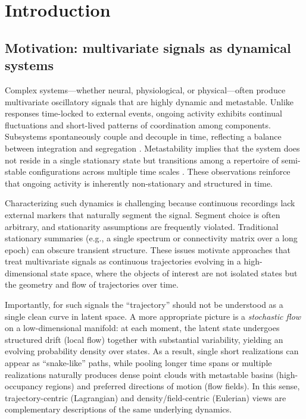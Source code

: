 \documentclass[5p,twocolumn,authoryear]{elsarticle}
\begin{document}
\section{Introduction}

\subsection{Motivation: multivariate signals as dynamical systems}

Complex systems---whether neural, physiological, or physical---often produce multivariate oscillatory signals that are highly dynamic and metastable. Unlike responses time-locked to external events, ongoing activity exhibits continual fluctuations and short-lived patterns of coordination among components. Subsystems spontaneously couple and decouple in time, reflecting a balance between integration and segregation \citep{TognoliKelso2014}. Metastability implies that the system does not reside in a single stationary state but transitions among a repertoire of semi-stable configurations across multiple time scales \citep{Rabinovich2008,TognoliKelso2014}. These observations reinforce that ongoing activity is inherently non-stationary and structured in time.

Characterizing such dynamics is challenging because continuous recordings lack external markers that naturally segment the signal. Segment choice is often arbitrary, and stationarity assumptions are frequently violated. Traditional stationary summaries (e.g., a single spectrum or connectivity matrix over a long epoch) can obscure transient structure. These issues motivate approaches that treat multivariate signals as continuous trajectories evolving in a high-dimensional state space, where the objects of interest are not isolated states but the geometry and flow of trajectories over time.

Importantly, for such signals the ``trajectory'' should not be understood as a single clean curve in latent space. A more appropriate picture is a \emph{stochastic flow} on a low-dimensional manifold: at each moment, the latent state undergoes structured drift (local flow) together with substantial variability, yielding an evolving probability density over states. As a result, single short realizations can appear as ``snake-like'' paths, while pooling longer time spans or multiple realizations naturally produces dense point clouds with metastable basins (high-occupancy regions) and preferred directions of motion (flow fields). In this sense, trajectory-centric (Lagrangian) and density/field-centric (Eulerian) views are complementary descriptions of the same underlying dynamics.
\end{document}
